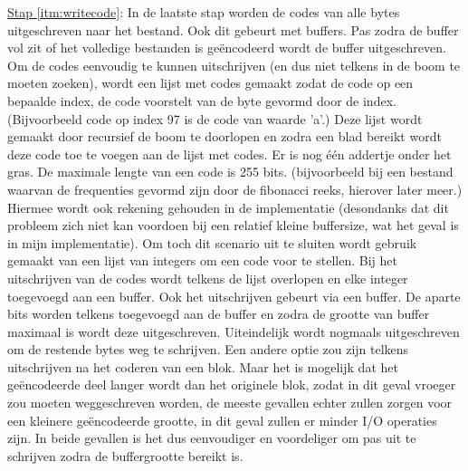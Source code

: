\documentclass[11pt, a4paper]{article}
\begin{document}
\newline\underline{Stap \ref{itm:writecode}}: In de laatste stap worden de codes van alle bytes uitgeschreven naar het bestand. Ook dit gebeurt met buffers. Pas zodra de buffer vol zit of het volledige bestanden is ge\"{e}ncodeerd wordt de buffer uitgeschreven. Om de codes eenvoudig te kunnen uitschrijven (en dus niet telkens in de boom te moeten zoeken), wordt een lijst met codes gemaakt zodat de code op een bepaalde index, de code voorstelt van de byte gevormd door de index. (Bijvoorbeeld code op index 97 is de code van waarde 'a'.) Deze lijst wordt gemaakt door recursief de boom te doorlopen en zodra een blad bereikt wordt deze code toe te voegen aan de lijst met codes. Er is nog \'{e}\'{e}n addertje onder het gras. De maximale lengte van een code is 255 bits. (bijvoorbeeld bij een bestand waarvan de frequenties gevormd zijn door de fibonacci reeks, hierover later meer.) Hiermee wordt ook rekening gehouden in de implementatie (desondanks dat dit probleem zich niet kan voordoen bij een relatief kleine buffersize, wat het geval is in mijn implementatie). Om toch dit scenario uit te sluiten wordt gebruik gemaakt van een lijst van integers om een code voor te stellen. Bij het uitschrijven van de codes wordt telkens de lijst overlopen en elke integer toegevoegd aan een buffer. Ook het uitschrijven gebeurt via een buffer. De aparte bits worden telkens toegevoegd aan de buffer en zodra de grootte van buffer maximaal is wordt deze uitgeschreven. Uiteindelijk wordt nogmaals uitgeschreven om de restende bytes weg te schrijven. Een andere optie zou zijn telkens uitschrijven na het coderen van een blok. Maar het is mogelijk dat het ge\"{e}ncodeerde deel langer wordt dan het originele blok, zodat in dit geval vroeger zou moeten weggeschreven worden, de meeste gevallen echter zullen zorgen voor een kleinere ge\"{e}ncodeerde grootte, in dit geval zullen er minder I/O operaties zijn. In beide gevallen is het dus eenvoudiger en voordeliger om pas uit te schrijven zodra de buffergrootte bereikt is. 
\end{document}
